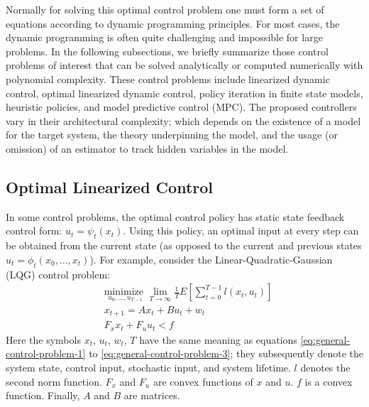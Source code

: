 Normally for solving this optimal control problem one must form a set of equations according to dynamic programming principles. For most cases, the dynamic programming is often quite challenging and impossible for large problems. 
In the following subsections, we briefly summarize those control problems of interest that can be solved analytically or computed numerically with polynomial complexity. These control problems include linearized dynamic control, optimal linearized dynamic control, policy iteration in finite state models, heuristic policies, and model predictive control (MPC).   
 The proposed controllers vary in their architectural complexity; which depends on the existence of a model for the target system, the theory underpinning the model, and the usage (or omission) of an estimator to track hidden variables in the model. 

\subsection{Optimal Linearized Control}
\label{sec:optimal-linearized-control}       
In some control problems, the optimal control policy has static state feedback control form: $u_t=\psi_t(x_t)$. Using this policy, an optimal input at every step can be obtained from the current state (as opposed to the current and previous states $u_t=\phi_t(x_0,...,x_t)$). 
 For example, consider the Linear-Quadratic-Gaussian (LQG) control problem:
 \begin{align}
   & \underset{u_0,...,u_{T-1}} {\text{minimize  } }   \lim_{T\to\infty}  \frac{1}{T} E\left[\sum_{t=0}^{T-1} l(x_t,u_t)\right]   \label{eq:linear-control-problem-1} \\  
   & x_{t+1}=Ax_t+Bu_t+w_t \label{eq:linear-control-problem-2} \\ 
   &  F_x x_t + F_u u_t < f  \label{eq:linear-control-problem-3}      
  \end{align} 
   Here the symbols  $x_t$, $u_t$, $w_t$, $T$  have the same meaning as equations  \ref{eq:general-control-problem-1}  to \ref{eq:general-control-problem-3}; they subsequently denote the system state, control input, stochastic input, and system lifetime. 
$l$ denotes the second norm function. 
$F_x$  and $F_u$ are convex functions of $x$ and $u$.
$f$  is a convex function.
Finally, $A$ and $B$ are matrices.  

